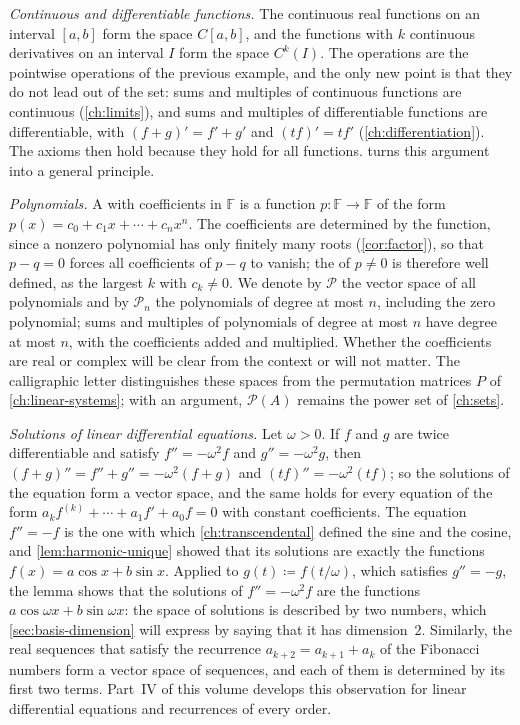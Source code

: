 \emph{Continuous and differentiable functions.} The continuous real functions on an interval $[a,b]$ form the space $C[a,b]$, and the functions with $k$ continuous derivatives on an interval $I$ form the space $C^k(I)$. The operations are the pointwise operations of the previous example, and the only new point is that they do not lead out of the set: sums and multiples of continuous functions are continuous (\cref{ch:limits}), and sums and multiples of differentiable functions are differentiable, with $(f+g)'=f'+g'$ and $(tf)'=tf'$ (\cref{ch:differentiation}). The axioms then hold because they hold for all functions.  turns this argument into a general principle.

\emph{Polynomials.} A  with coefficients in $\mathbb F$ is a function $p\colon\mathbb F\to\mathbb F$ of the form $p(x)=c_0+c_1x+\cdots+c_nx^n$. The coefficients are determined by the function, since a nonzero polynomial has only finitely many roots (\cref{cor:factor}), so that $p-q=0$ forces all coefficients of $p-q$ to vanish; the  of $p\ne0$ is therefore well defined, as the largest $k$ with $c_k\ne0$. We denote by $\mathcal P$ the vector space of all polynomials and by $\mathcal P_n$ the polynomials of degree at most $n$, including the zero polynomial; sums and multiples of polynomials of degree at most $n$ have degree at most $n$, with the coefficients added and multiplied. Whether the coefficients are real or complex will be clear from the context or will not matter. The calligraphic letter distinguishes these spaces from the permutation matrices $P$ of \cref{ch:linear-systems}; with an argument, $\mathcal P(A)$ remains the power set of \cref{ch:sets}.

\emph{Solutions of linear differential equations.} Let $\omega>0$. If $f$ and $g$ are twice differentiable and satisfy $f''=-\omega^2f$ and $g''=-\omega^2g$, then $(f+g)''=f''+g''=-\omega^2(f+g)$ and $(tf)''=-\omega^2(tf)$; so the solutions of the equation form a vector space, and the same holds for every equation of the form $a_kf^{(k)}+\cdots+a_1f'+a_0f=0$ with constant coefficients. The equation $f''=-f$ is the one with which \cref{ch:transcendental} defined the sine and the cosine, and \cref{lem:harmonic-unique} showed that its solutions are exactly the functions $f(x)=a\cos x+b\sin x$. Applied to $g(t)\coloneqq f(t/\omega)$, which satisfies $g''=-g$, the lemma shows that the solutions of $f''=-\omega^2f$ are the functions $a\cos\omega x+b\sin\omega x$: the space of solutions is described by two numbers, which \cref{sec:basis-dimension} will express by saying that it has dimension~$2$. Similarly, the real sequences that satisfy the recurrence $a_{k+2}=a_{k+1}+a_k$ of the Fibonacci numbers form a vector space of sequences, and each of them is determined by its first two terms. Part~IV of this volume develops this observation for linear differential equations and recurrences of every order.

